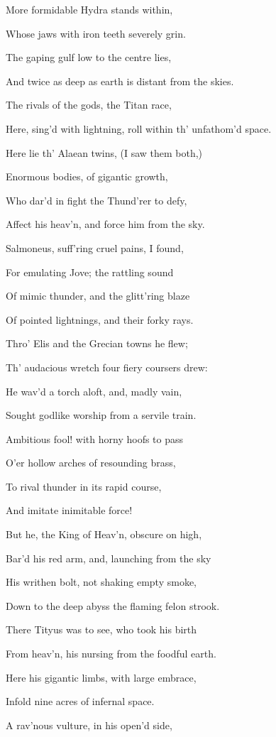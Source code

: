 More formidable Hydra stands within,

Whose jaws with iron teeth severely grin.

The gaping gulf low to the centre lies,

And twice as deep as earth is distant from the skies.

The rivals of the gods, the Titan race,

Here, sing’d with lightning, roll within th’ unfathom’d space.

Here lie th’ Alaean twins, (I saw them both,)

Enormous bodies, of gigantic growth,

Who dar’d in fight the Thund’rer to defy,

Affect his heav’n, and force him from the sky.

Salmoneus, suff’ring cruel pains, I found,

For emulating Jove; the rattling sound

Of mimic thunder, and the glitt’ring blaze

Of pointed lightnings, and their forky rays.

Thro’ Elis and the Grecian towns he flew;

Th’ audacious wretch four fiery coursers drew:

He wav’d a torch aloft, and, madly vain,

Sought godlike worship from a servile train.

Ambitious fool! with horny hoofs to pass

O’er hollow arches of resounding brass,

To rival thunder in its rapid course,

And imitate inimitable force!

But he, the King of Heav’n, obscure on high,

Bar’d his red arm, and, launching from the sky

His writhen bolt, not shaking empty smoke,

Down to the deep abyss the flaming felon strook.

There Tityus was to see, who took his birth

From heav’n, his nursing from the foodful earth.

Here his gigantic limbs, with large embrace,

Infold nine acres of infernal space.

A rav’nous vulture, in his open’d side,

